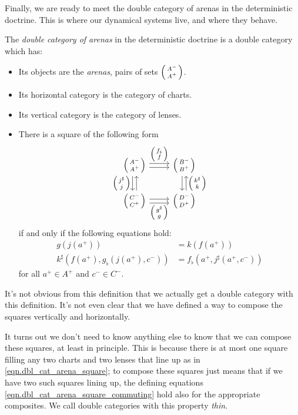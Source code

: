 \documentclass[DynamicalBook]{subfiles}
\begin{document}
Finally, we are ready to meet the double category of arenas in the deterministic
doctrine. This is where our dynamical
systems live, and where they behave.

\begin{definition}\label{def.double_category_of_arenas_discrete}
  The \emph{double category of arenas} in the deterministic doctrine is a double
  category which has:
  \begin{itemize}
  \item Its objects are the \emph{arenas}, pairs of sets $\lens{A^-}{A^+}$.
  \item Its horizontal category is the category of charts.
  \item Its vertical category is the category of lenses.
  \item There is a square of the following form
    \begin{equation}\label{eqn.dbl_cat_arena_square}
      \begin{tikzcd}
        \lens{A^-}{A^+} \ar[r, shift left, "\lens{f_{\flat}}{f}"] \ar[r, shift
        right] \ar[d, shift right, "\lens{j^{\sharp}}{j}"'] \ar[d, shift left,
        leftarrow] & \lens{B^-}{B^+} \ar[d, shift left, leftarrow,
        "\lens{k^{\sharp}}{k}"] \ar[d, shift right]\\
        \lens{C^-}{C^+} \ar[r, shift right, "\lens{g^{\sharp}}{g}"'] \ar[r,
        shift left] & \lens{D^-}{D^+}
      \end{tikzcd}
    \end{equation}
    if and only if the following equations hold:
    \begin{align}\label{eqn.dbl_cat_arena_square_commuting}
      g(j(a^+)) &= k(f(a^+)) \\
      k^{\sharp}(f(a^+), g_{\flat}(j(a^+), c^-)) &= f_{\flat}(a^+, j^{\sharp}(a^+, c^-)) 
    \end{align}
    for all $a^+ \in A^+$ and $c^- \in C^-$.
  \end{itemize}
\end{definition}

It's not obvious from this definition that we actually get a double category
with this definition. It's not even clear that we have defined a way to compose
the squares vertically and horizontally.

It turns out we don't need to know anything else to know that we can compose
these squares, at least in principle. This is because there is at most one
square filling any two charts and two lenses that line up as in
\cref{eqn.dbl_cat_arena_square}; to compose these squares just means that if we
have two such squares lining up, the defining equations
\cref{eqn.dbl_cat_arena_square_commuting} hold also for the appropriate
composites. We call double categories with this property \emph{thin}.
\end{document}
